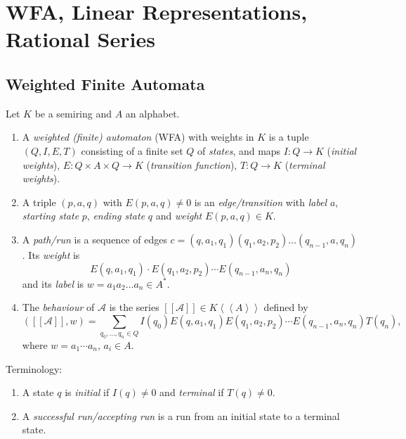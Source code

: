 \section{WFA, Linear Representations, Rational Series}

\subsection{Weighted Finite Automata}

\begin{definition}
    Let $K$ be a semiring and $A$ an alphabet.
    \begin{enumerate}[(1)]
        \item A \emph{weighted (finite) automaton} (WFA) with weights in $K$ 
        is a tuple $(Q, I, E, T)$ consisting of a finite set $Q$ of \emph{states},
        and maps $I \colon Q \rightarrow K$ (\emph{initial weights}), 
        $E \colon Q \times A \times Q \rightarrow K$ (\emph{transition function}),
        $T \colon Q \to K$ (\emph{terminal weights}).
        \item A triple $(p, a, q)$ with $E(p, a, q) \neq 0$ is an 
        \emph{edge/transition} with \emph{label} $a$, \emph{starting state} 
        $p$, \emph{ending state} $q$ and \emph{weight} $E(p, a, q) \in K$.
        \item A \emph{path/run} is a sequence of edges
        $c=(q,a_1, q_1)(q_1, a_2, p_2) \dots (q_{n-1}, a, q_n)$. Its 
        \emph{weight} is 
        \[
            E(q,a_1, q_1)\cdot E(q_1, a_2, p_2) \cdots E(q_{n-1}, a_n, q_n)
        \]
        and its \emph{label} is $w = a_1a_2\dots a_n \in A^*$.
        \item The \emph{behaviour} of $\mathcal{A}$ is the series $[[\mathcal{A}]]
        \in K \left<\left<A\right>\right>$ defined by 
        \[
            ([[\mathcal{A}]], w) = \sum_{q_0, \dots, q_n \in Q} I(q_0)
            E(q,a_1, q_1)E(q_1, a_2, p_2) \cdots E(q_{n-1}, a_n, q_n)T(q_n),
        \]
        where $w = a_1\cdots a_n$, $a_i \in A$.
    \end{enumerate}
\end{definition}

\begin{definition} Terminology:
    \begin{enumerate}
        \item A state $q$ is \emph{initial} if $I(q) \neq 0$ and 
        \emph{terminal}  if $T(q) \neq 0$.
        \item A \emph{successful run/accepting run} is a run from 
        an initial state to a terminal state.
    \end{enumerate}
\end{definition}

